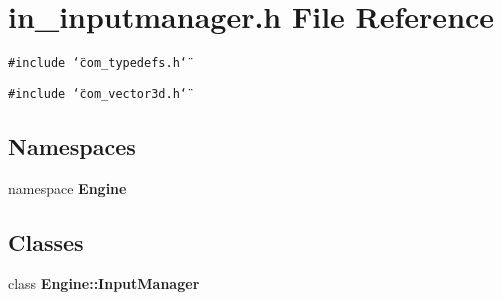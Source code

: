 \section{in\_\-inputmanager.h File Reference}
\label{in__inputmanager_8h}
{\tt \#include \char`\"{}com\_\-typedefs.h\char`\"{}}\par
{\tt \#include \char`\"{}com\_\-vector3d.h\char`\"{}}\par
\subsection*{Namespaces}
\begin{CompactItemize}
\item 
namespace {\bf Engine}
\end{CompactItemize}
\subsection*{Classes}
\begin{CompactItemize}
\item 
class {\bf Engine::InputManager}
\end{CompactItemize}
